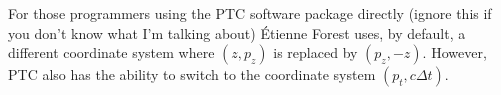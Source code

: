 For those programmers using the PTC
software package directly (ignore
this if you don't know what I'm talking about) \'Etienne Forest uses,
by default, a different coordinate system where $(z, p_z)$ is replaced
by $(p_z, -z)$. However, PTC also has the ability to switch to the
coordinate system $(p_t, c \Delta t)$.